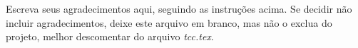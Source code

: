 \begin{agradecimentos}



Escreva seus agradecimentos aqui, seguindo as instruções acima. Se decidir não incluir agradecimentos, deixe este arquivo em branco, mas não o exclua do projeto, melhor descomentar do arquivo \textit{tcc.tex}.

\end{agradecimentos}

